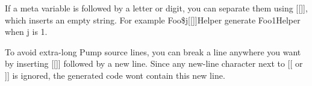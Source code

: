 \begin{DoxyItemize}
\item If a meta variable is followed by a letter or digit, you can separate them using {\ttfamily \mbox{[}\mbox{[}\mbox{]}\mbox{]}}, which inserts an empty string. For example {\ttfamily Foo\$j\mbox{[}\mbox{[}\mbox{]}\mbox{]}Helper} generate {\ttfamily Foo1\+Helper} when {\ttfamily j} is 1.
\item To avoid extra-\/long Pump source lines, you can break a line anywhere you want by inserting {\ttfamily \mbox{[}\mbox{[}\mbox{]}\mbox{]}} followed by a new line. Since any new-\/line character next to {\ttfamily \mbox{[}\mbox{[}} or {\ttfamily \mbox{]}\mbox{]}} is ignored, the generated code won\textquotesingle{}t contain this new line. 
\end{DoxyItemize}